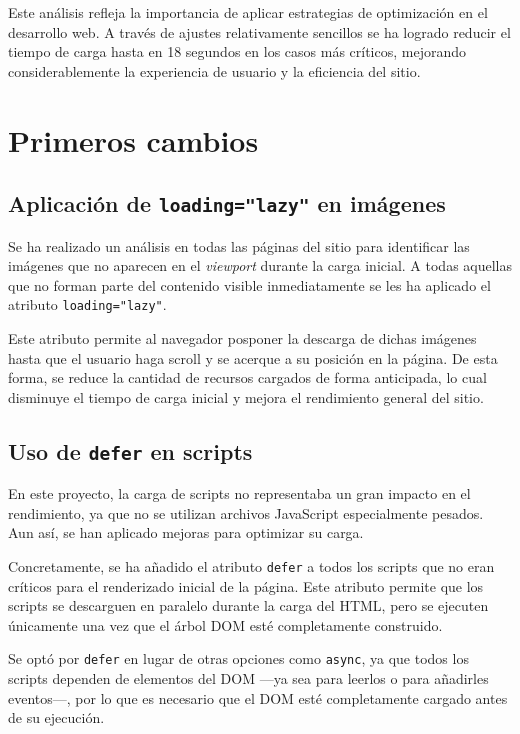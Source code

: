 \documentclass{article}
\begin{document}
Este análisis refleja la importancia de aplicar estrategias de optimización en el desarrollo web. A través de ajustes relativamente sencillos se ha logrado reducir el tiempo de carga hasta en 18 segundos en los casos más críticos, mejorando considerablemente la experiencia de usuario y la eficiencia del sitio.

\section{Primeros cambios}\label{sec:primeros-cambios}

\subsection{Aplicación de \texttt{loading="lazy"} en imágenes}\label{subsec:loading-lazy}

Se ha realizado un análisis en todas las páginas del sitio para identificar las imágenes que no aparecen en el \textit{viewport} durante la carga inicial. A todas aquellas que no forman parte del contenido visible inmediatamente se les ha aplicado el atributo \texttt{loading="lazy"}.

Este atributo permite al navegador posponer la descarga de dichas imágenes hasta que el usuario haga scroll y se acerque a su posición en la página. De esta forma, se reduce la cantidad de recursos cargados de forma anticipada, lo cual disminuye el tiempo de carga inicial y mejora el rendimiento general del sitio.

\subsection{Uso de \texttt{defer} en scripts}\label{subsec:defer-en-scripts}

En este proyecto, la carga de scripts no representaba un gran impacto en el rendimiento, ya que no se utilizan archivos JavaScript especialmente pesados. Aun así, se han aplicado mejoras para optimizar su carga.

Concretamente, se ha añadido el atributo \texttt{defer} a todos los scripts que no eran críticos para el renderizado inicial de la página. Este atributo permite que los scripts se descarguen en paralelo durante la carga del HTML, pero se ejecuten únicamente una vez que el árbol DOM esté completamente construido.

Se optó por \texttt{defer} en lugar de otras opciones como \texttt{async}, ya que todos los scripts dependen de elementos del DOM —ya sea para leerlos o para añadirles eventos—, por lo que es necesario que el DOM esté completamente cargado antes de su ejecución.
\end{document}
